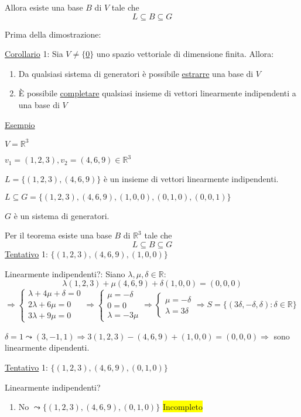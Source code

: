 \documentclass{article}
\newcommand{\hl}[1]{\colorbox{yellow}{#1}}
\newcommand{\ul}[1]{\underline{#1}}
\newcommand{\R}{\mathbb{R}}
\begin{document}
Allora esiste una base $B$ di $V$ tale che
$$L\subseteq B\subseteq G$$

Prima della dimostrazione:

\ul{Corollario} 1: Sia $V\not=\{$\ul{0}$\}$ uno spazio vettoriale di dimensione finita. Allora:
\begin{enumerate}
	\item Da qualsiasi sistema di generatori è possibile \ul{estrarre} una base di $V$
	\item È possibile \ul{completare} qualsiasi insieme di vettori linearmente indipendenti a una base di $V$
\end{enumerate}

\ul{Esempio}

$V=\R^3$

$v_1=(1,2,3),v_2=(4,6,9)\in\R^3$

$L=\{(1,2,3),(4,6,9)\}$ è un insieme di vettori linearmente indipendenti.

$L\subseteq G=\{(1,2,3),(4,6,9),(1,0,0),(0,1,0),(0,0,1)\}$

$G$ è un sistema di generatori.

Per il teorema esiste una base $B$ di $\R^3$ tale che
$$L\subseteq B\subseteq G$$
\ul{Tentativo} 1: $\{(1,2,3),(4,6,9),(1,0,0)\}$

Linearmente indipendenti?: Siano $\lambda,\mu,\delta\in\R:$
$$\lambda(1,2,3)+\mu(4,6,9)+\delta(1,0,0)=(0,0,0)$$
$\Rightarrow\begin{cases}
		\lambda+4\mu+\delta=0 \\
		2\lambda+6\mu=0       \\
		3\lambda+9\mu=0
	\end{cases}\Rightarrow
	\begin{cases}
		\mu=-\delta \\
		0=0         \\
		\lambda=-3\mu
	\end{cases}\Rightarrow
	\begin{cases}
		\mu=-\delta \\
		\lambda=3\delta
	\end{cases}\Rightarrow
	S=\{(3\delta,-\delta,\delta):\delta\in\R\}$

$\delta=1\leadsto(3,-1,1)\Rightarrow3(1,2,3)-(4,6,9)+(1,0,0)=(0,0,0)\Rightarrow$ sono linearmente dipendenti.

\ul{Tentativo} 1: $\{(1,2,3),(4,6,9),(0,1,0)\}$

Linearmente indipendenti?
\begin{enumerate}
	\item No $\leadsto\{(1,2,3),(4,6,9),(0,1,0)\}$ \hl{Incompleto}
\end{enumerate}
\end{document}
